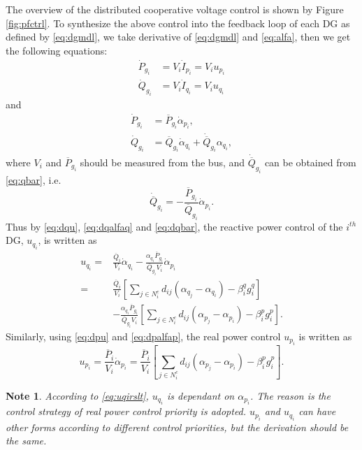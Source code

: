 \documentclass{article}
\newtheorem{note}{Note}[section]
\begin{document}
The overview of the distributed cooperative voltage control is shown by Figure \ref{fig:pfctrl}. To synthesize the above control into the feedback loop of each DG as defined by \eqref{eq:dgmdl}, we take derivative of \eqref{eq:dgmdl} and \eqref{eq:alfa}, then we get the following equations:
\begin{subequations}
\begin{align}
    \dot P_{g_i} &= V_i \dot I_{p_i} = V_i u_{p_i} \label{eq:dpu}\\
    \dot Q_{g_i} &= V_i \dot I_{q_i} = V_i u_{q_i} \label{eq:dqu}
\end{align}
\end{subequations}
and
\begin{subequations}
\begin{align}
    \dot P_{g_i} &= \overline{P}_{g_i} \dot \alpha_{p_i},\label{eq:dpalfap}\\
    \dot Q_{g_i} &= \overline{Q}_{g_i} \dot \alpha_{q_i} + \dot {\overline Q}_{g_i} \alpha_{q_i},\label{eq:dqalfaq}
\end{align}
\end{subequations}
where $V_i$ and $\overline{P}_{g_i}$ should be measured from the bus, and $\dot {\overline Q}_{g_i}$ can be obtained from \eqref{eq:qbar}, i.e.
\begin{equation}
    \dot {\overline Q}_{g_i} =- \frac{\overline{P}_{g_i}}{ {\overline Q}_{g_i}}\dot \alpha_{p_i}.\label{eq:dqbar}
\end{equation}
Thus by \eqref{eq:dqu}, \eqref{eq:dqalfaq} and \eqref{eq:dqbar}, the reactive power control of the $i^{th}$ DG, $u_{q_i}$, is written as
\begin{equation}
\begin{split}
    u_{q_i} =&\frac{\overline{Q}_i}{V_i} \dot \alpha_{q_i}- \frac{ \alpha_{q_i} \overline{P}_{g_i}} {\overline Q_{g_i}V_i}\dot \alpha_{p_i}
    \\=& \frac{\overline{Q}_i}{V_i} \left [\sum_{j \in N_i^c}d_{ij} (\alpha_{q_j}-\alpha_{q_i})- \beta^q_i g^q_{i}\right] \\&-\frac{ \alpha_{q_i} \overline{P}_{g_i}}{\overline Q_{g_i}V_i} \left [\sum_{j \in N_i^c}d_{ij} (\alpha_{p_j}-\alpha_{p_i}) - \beta^p_i g^p_{i}\right] .
\end{split}\label{eq:uqirslt}
\end{equation}
Similarly, using \eqref{eq:dpu} and \eqref{eq:dpalfap}, the real power control $u_{p_i}$ is written as
\begin{equation}
    u_{p_i} = \frac{\overline{P}_i}{V_i} \dot \alpha_{p_i} = \frac{\overline{P}_i}{V_i} \left [\sum_{j \in N_i^c}d_{ij} (\alpha_{p_j}-\alpha_{p_i}) - \beta^p_i g^p_{i}\right].\label{eq:upirslt}
\end{equation}
\begin{note}
According to \eqref{eq:uqirslt}, $u_{q_i}$ is dependant on $\alpha_{p_i}$. The reason is the control strategy of real power control priority is adopted. $u_{p_i}$ and $u_{q_i}$ can have other forms according to different control priorities, but the derivation should be the same.
\end{note}
\end{document}
